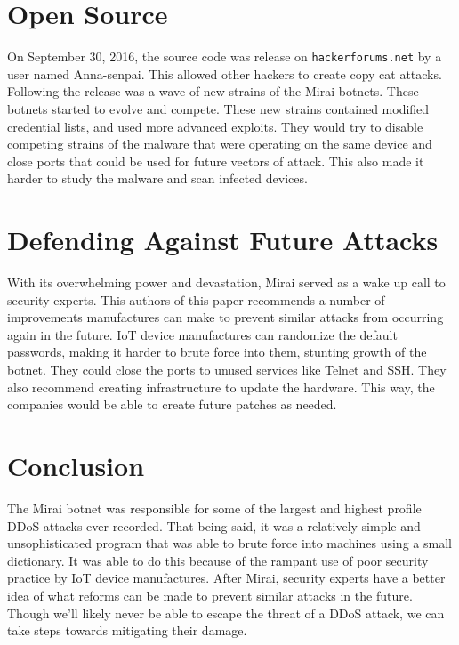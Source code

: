 \documentclass[conference]{IEEEtran}
\begin{document}
\section{Open Source}

On September 30, 2016, the source code was release on \verb|hackerforums.net| by a user named Anna-senpai. This allowed other hackers to create copy cat attacks. Following the release was a wave of new strains of the Mirai botnets. These botnets started to evolve and compete. These new strains contained modified credential lists, and used more advanced exploits. They would try to disable competing strains of the malware that were operating on the same device and close ports that could be used for future vectors of attack. This also made it harder to study the malware and scan infected devices. 

\section{Defending Against Future Attacks}

With its overwhelming power and devastation, Mirai served as a wake up call to security experts. This authors of this paper recommends a number of improvements manufactures can make to prevent similar attacks from occurring again in the future. IoT device manufactures can randomize the default passwords, making it harder to brute force into them, stunting growth of the botnet. They could close the ports to unused services like Telnet and SSH. They also recommend creating infrastructure to update the hardware. This way, the companies would be able to create future patches as needed.

\section{Conclusion}

The Mirai botnet was responsible for some of the largest and highest profile DDoS attacks ever recorded. That being said, it was a relatively simple and unsophisticated program that was able to brute force into machines using a small dictionary. It was able to do this because of the rampant use of poor security practice by IoT device manufactures. After Mirai, security experts have a better idea of what reforms can be made to prevent similar attacks in the future. Though we'll likely never be able to escape the threat of a DDoS attack, we can take steps towards mitigating their damage.



\end{document}
